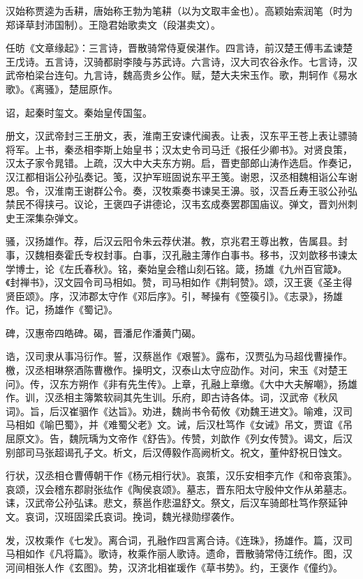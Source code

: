\documentclass[a4paper,12pt,UTF8,twoside]{ctexbook}
\begin{document}
    汉始称贾逵为舌耕，唐始称王勃为笔耕（以为文取丰金也）。高颖始索润笔（时为郑译草封沛国制）。王隐君始歌卖文（段湛卖文）。
    
    任昉《文章缘起》：三言诗，晋散骑常侍夏侯湛作。四言诗，前汉楚王傅韦孟谏楚王戊诗。五言诗，汉骑都尉李陵与苏武诗。六言诗，汉大司农谷永作。七言诗，汉武帝柏梁台连句。九言诗，魏高贵乡公作。赋，楚大夫宋玉作。歌，荆轲作《易水歌》。《离骚》，楚屈原作。
    
    诏，起秦时玺文。秦始皇传国玺。
    
    册文，汉武帝封三王册文，表，淮南王安谏代闽表。让表，汉东平王苍上表让骠骑将军。上书，秦丞相李斯上始皇书；汉太史令司马迁《报任少卿书》。对贤良策，汉太子家令晁错。上疏，汉大中大夫东方朔。启，晋吏部郎山涛作选启。作奏记，汉江都相诣公孙弘奏记。笺，汉护军班固说东平王笺。谢恩，汉丞相魏相诣公车谢恩。令，汉淮南王谢群公令。奏，汉牧乘奏书谏吴王濞。驳，汉吾丘寿王驳公孙弘禁民不得挟弓。议论，王褒四子讲德论，汉韦玄成奏罢郡国庙议。弹文，晋刘州刺史王深集杂弹文。
    
    骚，汉扬雄作。荐，后汉云阳令朱云荐伏湛。教，京兆君王尊出教，告属县。封事，汉魏相奏霍氏专权封事。白事，汉孔融主薄作白事书。移书，汉刘歆移书谏太学博士，论《左氏春秋》。铭，秦始皇会稽山刻石铭。箴，扬雄《九州百官箴》。《封禅书》，汉文园令司马相如。赞，司马相如作《荆轲赞》。颂，汉王褒《圣主得贤臣颂》。序，汉沛郡太守作《邓后序》。引，琴操有《箜篌引》。《志录》，扬雄作。记，扬雄作《蜀记》。
    
    碑，汉惠帝四皓碑。碣，晋潘尼作潘黄门碣。
    
    诰，汉司隶从事冯衍作。誓，汉蔡邕作《艰誓》。露布，汉贾弘为马超伐曹操作。檄，汉丞相琳祭酒陈曹檄作。操明文，汉泰山太守应劭作。对问，宋玉《对楚王问》。传，汉东方朔作《非有先生传》。上章，孔融上章缴。《大中大夫解嘲》，扬雄作。训，汉丞相主簿繁软祠其先生训。乐府，即古诗各体。词，汉武帝《秋风词》。旨，后汉崔骃作《达旨》。劝进，魏尚书令荀攸《劝魏王进文》。喻难，汉司马相如《喻巴蜀》，并《难蜀父老》文。诫，后汉杜笃作《女诫》吊文，贾谊《吊屈原文》。告，魏阮瑀为文帝作《舒告》。传赞，刘歆作《列女传赞》。谒文，后汉别部司马张超谒孔子文。析文，后汉傅毅作高阙析文。祝文，董仲舒祝日蚀文。
    
    行状，汉丞相仓曹傅朝干作《杨元相行状》。哀策，汉乐安相李亢作《和帝哀策》。哀颂，汉会稽东郡尉张纮作《陶侯哀颂》。墓志，晋东阳太守殷仲文作从弟墓志。诔，汉武帝公孙弘诔。悲文，蔡邕作悲温舒文。祭文，后汉车骑郎杜笃作祭延钟文。哀词，汉班固梁氏哀词。挽词，魏光禄勋缪袭作。
    
    发，汉枚乘作《七发》。离合词，孔融作四言离合诗。《连珠》，扬雄作。篇，汉司马相如作《凡将篇》。歌诗，枚乘作丽人歌诗。遗命，晋散骑常侍江统作。图，汉河间相张人作《玄图》。势，汉济北相崔瑗作《草书势》。约，王褒作《僮约》。
    
\end{document}
